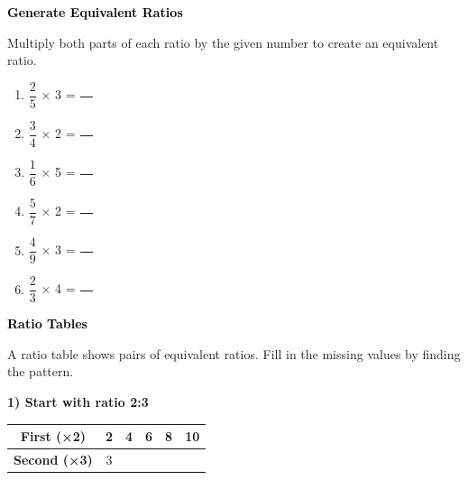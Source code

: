 \documentclass[12pt, letterpaper, fleqn]{article}
\begin{document}
\newpage

\begin{tcolorbox}[colback=customteal!20]
\large\textcolor{black}{\textbf{Generate Equivalent Ratios}}
\end{tcolorbox}

\noindent
Multiply both parts of each ratio by the given number to create an equivalent ratio.

\vspace{3mm}

\begin{enumerate}[itemsep=1.2cm, leftmargin=0.6cm]

\item $\dfrac{2}{5}$ × 3 = $\dfrac{\phantom{00}}{\phantom{00}}$

\item $\dfrac{3}{4}$ × 2 = $\dfrac{\phantom{00}}{\phantom{00}}$

\item $\dfrac{1}{6}$ × 5 = $\dfrac{\phantom{00}}{\phantom{00}}$

\item $\dfrac{5}{7}$ × 2 = $\dfrac{\phantom{00}}{\phantom{00}}$

\item $\dfrac{4}{9}$ × 3 = $\dfrac{\phantom{00}}{\phantom{00}}$

\item $\dfrac{2}{3}$ × 4 = $\dfrac{\phantom{00}}{\phantom{00}}$

\end{enumerate}

\newpage

\begin{tcolorbox}[colback=customteal!20]
\large\textcolor{black}{\textbf{Ratio Tables}}
\end{tcolorbox}

\noindent
A ratio table shows pairs of equivalent ratios. Fill in the missing values by finding the pattern.

\vspace{3mm}

\noindent
\textbf{1) Start with ratio 2:3}

\begin{center}
\begin{tabular}{|c|c|c|c|c|c|}
\hline
\textbf{First (×2)} & 2 & 4 & 6 & 8 & 10 \\
\hline
\textbf{Second (×3)} & 3 & \phantom{00} & \phantom{00} & \phantom{00} & \phantom{00} \\
\hline
\end{tabular}
\end{center}
\end{document}

